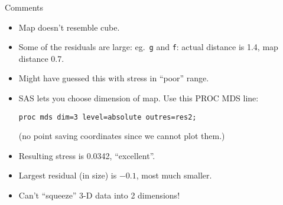 \documentclass[pdf]{prosper}
\begin{document}
\begin{slide}{Comments}

  \begin{itemize}
  \item Map doesn't resemble cube.
  \item Some of the residuals are large: eg.\ \verb-g- and \verb-f-: actual distance is 1.4, map distance 0.7.
  \item Might have guessed this with stress in ``poor'' range.
  \item SAS lets you choose dimension of map. Use this PROC MDS line:
 
\begin{verbatim}
proc mds dim=3 level=absolute outres=res2;
\end{verbatim}

(no point saving coordinates since we cannot plot them.)
\item Resulting stress is 0.0342, ``excellent''.
\item Largest residual (in size) is $-0.1$, most much smaller.
\item Can't ``squeeze'' 3-D data into 2 dimensions!
  \end{itemize}
  
\end{slide}
\end{document}

